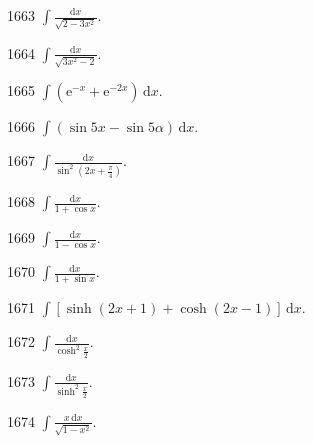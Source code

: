 \begin{prob}[S]{1663}
$\displaystyle\int \frac{\mathrm{d}x}{\sqrt{2 - 3x^2}}.$
\end{prob}

\begin{prob}[S]{1664}
$\displaystyle\int \frac{\mathrm{d}x}{\sqrt{3x^2 - 2}}.$
\end{prob}

\begin{prob}[S]{1665}
$\displaystyle\int (\mathrm{e}^{-x} + \mathrm{e}^{-2x}) \,\mathrm{d}x.$
\end{prob}

\begin{prob}[S]{1666}
$\displaystyle\int (\sin 5x - \sin 5\alpha) \,\mathrm{d}x.$
\end{prob}

\begin{prob}[S]{1667}
$\displaystyle\int \frac{\mathrm{d}x}{\sin^2\left(2x + \frac{\pi}{4}\right)}.$
\end{prob}

\begin{prob}[S]{1668}
$\displaystyle\int \frac{\mathrm{d}x}{1 + \cos x}.$
\end{prob}

\begin{prob}[S]{1669}
$\displaystyle\int \frac{\mathrm{d}x}{1 - \cos x}.$
\end{prob}

\begin{prob}[S]{1670}
$\displaystyle\int \frac{\mathrm{d}x}{1 + \sin x}.$
\end{prob}

\begin{prob}[S]{1671}
$\displaystyle\int [\sinh(2x + 1) + \cosh(2x - 1)] \,\mathrm{d}x.$
\end{prob}

\begin{prob}[S]{1672}
$\displaystyle\int \frac{\mathrm{d}x}{\cosh^2 \frac{x}{2}}.$
\end{prob}

\begin{prob}[S]{1673}
$\displaystyle\int \frac{\mathrm{d}x}{\sinh^2 \frac{x}{2}}.$
\end{prob}


\begin{prob}[S]{1674}
$\displaystyle\int \frac{x\,\mathrm{d}x}{\sqrt{1 - x^2}}.$
\end{prob}

